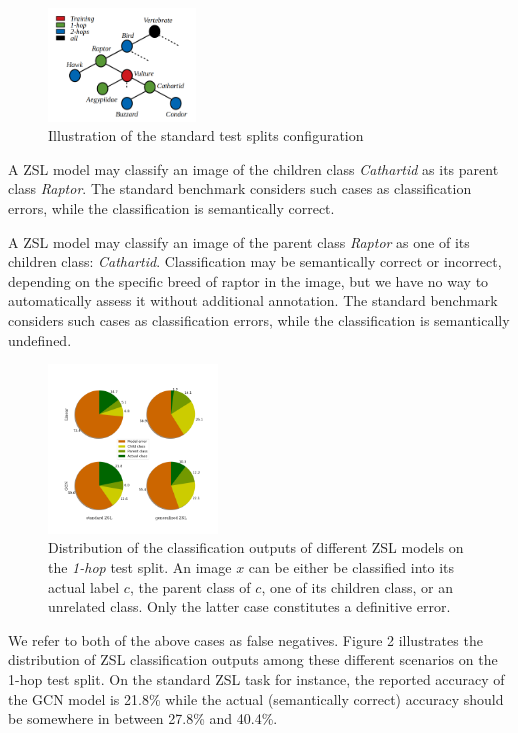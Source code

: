 \begin{figure}[h]
\centering
\includegraphics[width=0.35\textwidth]{Figure_1.png}
\caption{Illustration of the standard test splits configuration}
\end{figure}

A ZSL model may classify an image of the children class \textit{Cathartid} as its parent class \textit{Raptor}.
The standard benchmark considers such cases as classification errors, while the classification is semantically correct.

A ZSL model may classify an image of the parent class \textit{Raptor} as one of its children class: \textit{Cathartid}.
Classification may be semantically correct or incorrect, 
depending on the specific breed of raptor in the image, 
but we have no way to automatically assess it without additional annotation.
The standard benchmark considers such cases as classification errors, while the classification is semantically undefined.

\begin{figure}[h]
\centering
\includegraphics[width=0.4\textwidth]{Figure_2.png}
\caption{
Distribution of the classification outputs of different ZSL models on the \textit{1-hop} test split.
An image $x$ can be either be classified into its actual label $c$, 
the parent class of $c$, one of its children class, or an unrelated class.
Only the latter case constitutes a definitive error.
}
\end{figure}

We refer to both of the above cases as false negatives.
Figure 2 illustrates the distribution of ZSL classification outputs among these different scenarios on the 1-hop test split.
On the standard ZSL task for instance, the reported accuracy of the GCN model is 21.8\% 
while the actual (semantically correct) accuracy should be somewhere in between 27.8\% and 40.4\%.

